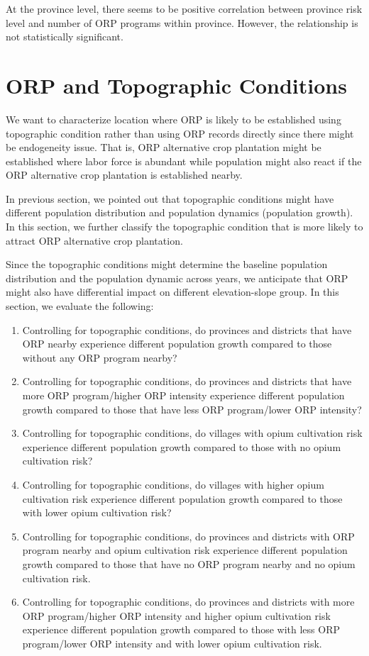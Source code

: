 \documentclass[
  letterpaper,
  DIV=11,
  numbers=noendperiod]{scrartcl}
\providecommand{\tightlist}{%
  \setlength{\itemsep}{0pt}\setlength{\parskip}{0pt}}\usepackage{longtable,booktabs,array}
\begin{document}
At the province level, there seems to be positive correlation between
province risk level and number of ORP programs within province. However,
the relationship is not statistically significant.

\section{ORP and Topographic
Conditions}\label{orp-and-topographic-conditions}

We want to characterize location where ORP is likely to be established
using topographic condition rather than using ORP records directly since
there might be endogeneity issue. That is, ORP alternative crop
plantation might be established where labor force is abundant while
population might also react if the ORP alternative crop plantation is
established nearby.

In previous section, we pointed out that topographic conditions might
have different population distribution and population dynamics
(population growth). In this section, we further classify the
topographic condition that is more likely to attract ORP alternative
crop plantation.

Since the topographic conditions might determine the baseline population
distribution and the population dynamic across years, we anticipate that
ORP might also have differential impact on different elevation-slope
group. In this section, we evaluate the following:

\begin{enumerate}
\def\labelenumi{\arabic{enumi}.}
\tightlist
\item
  Controlling for topographic conditions, do provinces and districts
  that have ORP nearby experience different population growth compared
  to those without any ORP program nearby?
\item
  Controlling for topographic conditions, do provinces and districts
  that have more ORP program/higher ORP intensity experience different
  population growth compared to those that have less ORP program/lower
  ORP intensity?
\item
  Controlling for topographic conditions, do villages with opium
  cultivation risk experience different population growth compared to
  those with no opium cultivation risk?
\item
  Controlling for topographic conditions, do villages with higher opium
  cultivation risk experience different population growth compared to
  those with lower opium cultivation risk?
\item
  Controlling for topographic conditions, do provinces and districts
  with ORP program nearby and opium cultivation risk experience
  different population growth compared to those that have no ORP program
  nearby and no opium cultivation risk.
\item
  Controlling for topographic conditions, do provinces and districts
  with more ORP program/higher ORP intensity and higher opium
  cultivation risk experience different population growth compared to
  those with less ORP program/lower ORP intensity and with lower opium
  cultivation risk.
\end{enumerate}
\end{document}
